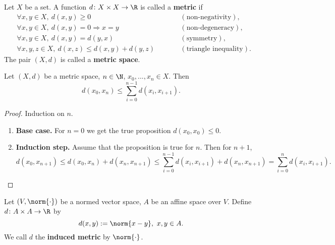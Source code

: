 \begin{definition}
  Let $X$ be a set.
  A function $d \colon X \times X \to \R$ is called a \textbf{metric} if
  \begin{subequations}
    \begin{alignat}{2}
      & \forall x, y \in X,\ d(x, y) \geq 0 \qquad
      && (\text{non-negativity}), \\
      & \forall x, y \in X,\ d(x, y) = 0 \Rightarrow x = y \qquad
      && (\text{non-degeneracy}), \\
      & \forall x, y \in X,\ d(x, y) = d(y, x) \qquad
      && (\text{symmetry}), \\
      & \forall x, y, z \in X,\ d(x, z) \leq d(x, y) + d(y, z) \qquad
      && (\text{triangle inequality}).
    \end{alignat}
  \end{subequations}
  The pair $(X, d)$ is called a \textbf{metric space}.
\end{definition}
\begin{proposition}
  Let
    $(X, d)$ be a metric space, $n \in \N$, $x_0, ..., x_n \in X$.
  Then
  \begin{equation}
    d(x_0, x_n) \leq \sum_{i = 0}^{n - 1} d(x_i, x_{i + 1}).
  \end{equation}
\end{proposition}
\begin{proof}
  Induction on $n$.
  \begin{enumerate}
    \item
      \textbf{Base case.}
      For $n = 0$ we get the true proposition $d(x_0, x_0) \leq 0$.
    \item
      \textbf{Induction step.}
      Assume that the proposition is true for $n$.
      Then for $n + 1$,
      \begin{equation}
        d(x_0, x_{n + 1})
        \leq d(x_0, x_n) + d(x_n, x_{n + 1})
        \leq \sum_{i = 0}^{n - 1} d(x_i, x_{i + 1}) + d(x_n, x_{n + 1})
        = \sum_{i = 0}^n d(x_i, x_{i + 1}).
      \end{equation}
  \end{enumerate}
\end{proof}
\begin{definition}
  Let
    $(V, \norm{\cdot})$ be a normed vector space,
    $A$ be an affine space over $V$.
  Define $d \colon A \times A \to \R$ by
  \begin{equation}
    d(x, y) := \norm{x - y},\ x, y \in A.
  \end{equation}
  We call $d$ the \textbf{induced metric} by $\norm{\cdot}$.
\end{definition}

